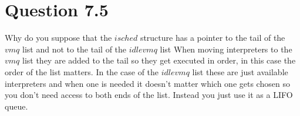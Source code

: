 \documentclass{article}
\begin{document}
\section*{Question 7.5}
Why do you suppose that the $isched$ structure has a pointer to the tail of the $vmq$ list and not to the tail of the $idlevmq$ list
\newline
\newline
When moving interpreters to the $vmq$ list they are added to the tail so they get executed in order, in this case the order of the list matters.
In the case of the $idlevmq$ list these are just available interpreters and when one is needed it doesn't matter which one gets chosen so you don't need access to both ends of the list.
Instead you just use it as a LIFO queue.
\end{document}

